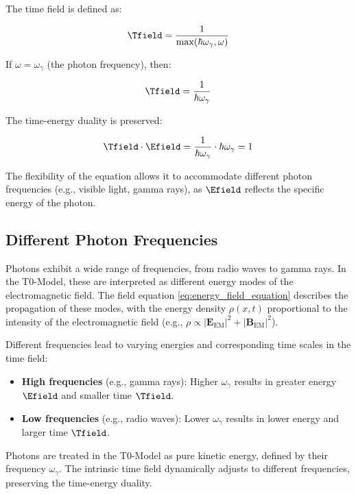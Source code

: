 The time field is defined as:

\begin{equation}
	\Tfield = \frac{1}{\max(\hbar \omega_\gamma, \omega)}
\end{equation}

If \(\omega = \omega_\gamma\) (the photon frequency), then:

\begin{equation}
	\Tfield = \frac{1}{\hbar \omega_\gamma}
\end{equation}

The time-energy duality is preserved:

\begin{equation}
	\Tfield \cdot \Efield = \frac{1}{\hbar \omega_\gamma} \cdot \hbar \omega_\gamma = 1
\end{equation}

The flexibility of the equation allows it to accommodate different photon frequencies (e.g., visible light, gamma rays), as \( \Efield \) reflects the specific energy of the photon.

\subsection{Different Photon Frequencies}
\label{subsec:photon_frequencies}

Photons exhibit a wide range of frequencies, from radio waves to gamma rays. In the T0-Model, these are interpreted as different energy modes of the electromagnetic field. The field equation \eqref{eq:energy_field_equation} describes the propagation of these modes, with the energy density \(\rho(x,t)\) proportional to the intensity of the electromagnetic field (e.g., \( \rho \propto |\mathbf{E}_{\text{EM}}|^2 + |\mathbf{B}_{\text{EM}}|^2 \)).

Different frequencies lead to varying energies and corresponding time scales in the time field:

\begin{itemize}
	\item \textbf{High frequencies} (e.g., gamma rays): Higher \(\omega_\gamma\) results in greater energy \( \Efield \) and smaller time \( \Tfield \).
	\item \textbf{Low frequencies} (e.g., radio waves): Lower \(\omega_\gamma\) results in lower energy and larger time \( \Tfield \).
\end{itemize}

\begin{important}
	Photons are treated in the T0-Model as pure kinetic energy, defined by their frequency \(\omega_\gamma\). The intrinsic time field dynamically adjusts to different frequencies, preserving the time-energy duality.
\end{important}

